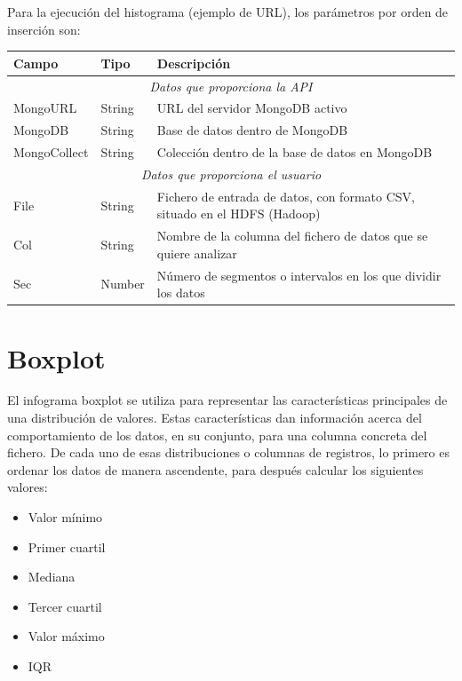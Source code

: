 Para la ejecución del histograma (ejemplo de URL\footnotemark), los parámetros por orden de inserción son:

\begin{tabular}{|l|l|p{7cm}|}
	\hline 
	\textbf{Campo} & \textbf{Tipo} & \textbf{Descripción} \\ 
	\hline \hline
	\multicolumn{3}{|c|}{\textit{Datos que proporciona la API}} \\
	\hline 
	MongoURL & String & URL del servidor MongoDB activo \\ 
	\hline 
	MongoDB & String & Base de datos dentro de MongoDB \\ 
	\hline 
	MongoCollect& String & Colección dentro de la base de datos en MongoDB \\ 
	\hline \hline
	\multicolumn{3}{|c|}{\textit{Datos que proporciona el usuario}} \\
	\hline 
	File & String & Fichero de entrada de datos, con formato CSV, situado en el HDFS (Hadoop) \\ 
	\hline 
	Col & String & Nombre de la columna del fichero de datos que se quiere analizar \\ 
	\hline 
	Sec & Number & Número de segmentos o intervalos en los que dividir los datos \\ 
	\hline 
\end{tabular} 


\section{Boxplot}
El infograma boxplot se utiliza para representar las características principales de una distribución de valores. Estas características dan información acerca del comportamiento de los datos, en su conjunto, para una columna concreta del fichero. De cada uno de esas distribuciones o columnas de registros, lo primero es ordenar los datos de manera ascendente, para después calcular los siguientes valores:
\begin{itemize}
	\item Valor mínimo
	\item Primer cuartil
	\item Mediana
	\item Tercer cuartil
	\item Valor máximo
	\item IQR
\end{itemize}

